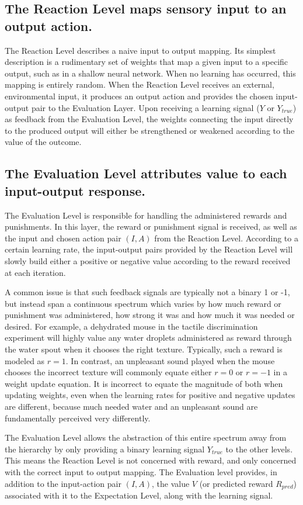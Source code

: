 \documentclass[11pt]{article}
\begin{document}
\subsection{The Reaction Level maps sensory input to an output action.}
The Reaction Level describes a naive input to output mapping.  Its simplest description is a rudimentary set of weights that map a given input to a specific output, such as in a shallow neural network.  When no learning has occurred, this mapping is entirely random. When the Reaction Level receives an external, environmental input, it produces an output action and provides the chosen input-output pair to the Evaluation Layer.  Upon receiving a learning signal ($Y$ or $Y_{true}$) as feedback from the Evaluation Level, the weights connecting the input directly to the produced output will either be strengthened or weakened according to the value of the outcome.

\subsection{The Evaluation Level attributes value to each input-output response.}
The Evaluation Level is responsible for handling the administered rewards and punishments.  In this layer, the reward or punishment signal is received, as well as the input and chosen action pair $(I, A)$ from the Reaction Level.  According to a certain learning rate, the input-output pairs provided by the Reaction Level will slowly build either a positive or negative value according to the reward received at each iteration.

A common issue is that such feedback signals are typically not a binary 1 or -1, but instead span a continuous spectrum which varies by how much reward or punishment was administered, how strong it was and how much it was needed or desired.  For example, a dehydrated mouse in the tactile discrimination experiment will highly value any water droplets administered as reward through the water spout when it chooses the right texture.  Typically, such a reward is modeled as $r = 1$.  In contrast, an unpleasant sound played when the mouse chooses the incorrect texture will commonly equate either $r = 0$ or $r = -1$ in a weight update equation.  It is incorrect to equate the magnitude of both when updating weights, even when the learning rates for positive and negative updates are different, because much needed water and an unpleasant sound are fundamentally perceived very differently.

The Evaluation Level allows the abstraction of this entire spectrum away from the hierarchy by only providing a binary learning signal $Y_{true}$ to the other levels.  This means the Reaction Level is not concerned with reward, and only concerned with the correct input to output mapping.  The Evaluation level provides, in addition to the input-action pair $(I, A)$, the value $V$ (or predicted reward $R_{pred}$) associated with it to the Expectation Level, along with the learning signal.
\end{document}
